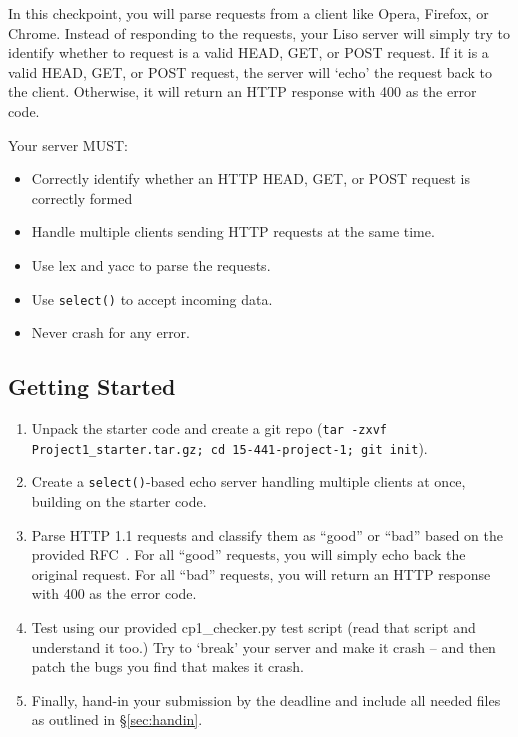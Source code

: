 \label{sec:cp1}
In this checkpoint, you will parse requests from a client like Opera, Firefox, or Chrome.
Instead of responding to the requests, your Liso server will simply try to identify whether to request is a valid HEAD, GET, or POST request.
If it is a valid HEAD, GET, or POST request, the server will `echo' the request back to the client.
Otherwise, it will return an HTTP response with 400 as the error code.

\vspace{5pt}

\noindent Your server MUST:
\begin{itemize}
  \item Correctly identify whether an HTTP HEAD, GET, or POST request is correctly formed  \item Handle multiple clients sending HTTP requests at the same time.
  \item Use lex and yacc to parse the requests.
  \item Use {\tt select()} to accept incoming data.
  \item Never crash for any error.
\end{itemize}

\subsection{Getting Started}
\begin{enumerate}
  \item Unpack the starter code and create a git repo (\texttt{tar -zxvf Project1\_starter.tar.gz; cd 15-441-project-1; git init}).

  \item Create a \texttt{select()}-based echo server handling multiple clients at once, building on the  starter code.  

  \item Parse HTTP 1.1 requests and classify them as ``good'' or ``bad'' based on the provided RFC~\cite{httprfc}. For all ``good'' requests, you will simply echo back the original request. For all ``bad'' requests, you will return an HTTP response with 400 as the error code.

  \item Test using our provided cp1\_checker.py test script (read that script and understand it too.) Try to `break' your server and make it crash -- and then patch the bugs you find that makes it crash.

  \item Finally, hand-in your
submission by the deadline and include all needed files as outlined in
\S\ref{sec:handin}.\\
\end{enumerate}

